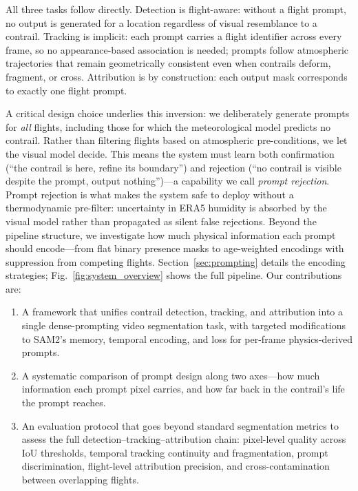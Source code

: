 \documentclass[1p,11pt]{elsarticle}
\begin{document}
All three tasks follow directly. Detection is flight-aware: without a flight prompt, no output is generated for a location regardless of visual resemblance to a contrail. Tracking is implicit: each prompt carries a flight identifier across every frame, so no appearance-based association is needed; prompts follow atmospheric trajectories that remain geometrically consistent even when contrails deform, fragment, or cross. Attribution is by construction: each output mask corresponds to exactly one flight prompt.

A critical design choice underlies this inversion: we deliberately generate prompts for \emph{all} flights, including those for which the meteorological model predicts no contrail. Rather than filtering flights based on atmospheric pre-conditions, we let the visual model decide. This means the system must learn both confirmation (``the contrail is here, refine its boundary'') and rejection (``no contrail is visible despite the prompt, output nothing'')---a capability we call \emph{prompt rejection}. Prompt rejection is what makes the system safe to deploy without a thermodynamic pre-filter: uncertainty in ERA5 humidity is absorbed by the visual model rather than propagated as silent false rejections. Beyond the pipeline structure, we investigate how much physical information each prompt should encode---from flat binary presence masks to age-weighted encodings with suppression from competing flights. Section~\ref{sec:prompting} details the encoding strategies; Fig.~\ref{fig:system_overview} shows the full pipeline. Our contributions are:
\begin{enumerate}
    \item A framework that unifies contrail detection, tracking, and attribution into a single dense-prompting video segmentation task, with targeted modifications to SAM2's memory, temporal encoding, and loss for per-frame physics-derived prompts.
    \item A systematic comparison of prompt design along two axes---how much information each prompt pixel carries, and how far back in the contrail's life the prompt reaches. 
    \item An evaluation protocol that goes beyond standard segmentation metrics to assess the full detection--tracking--attribution chain: pixel-level quality across IoU thresholds, temporal tracking continuity and fragmentation, prompt discrimination, flight-level attribution precision, and cross-contamination between overlapping flights.
\end{enumerate}
\end{document}

